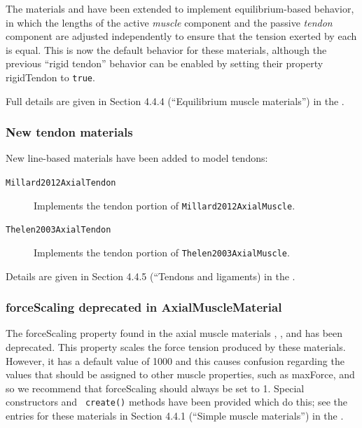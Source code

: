 \documentclass{article}
\begin{document}
The materials 
 and
have been extended to implement
equilibrium-based behavior, in which the lengths of the active {\it
muscle} component and the passive {\it tendon} component are adjusted
independently to ensure that the tension exerted by each is equal.
This is now the default behavior for these materials, although the
previous ``rigid tendon'' behavior can be enabled by setting their
property {\sf rigidTendon} to {\tt true}.

Full details are given in Section 4.4.4 (``Equilibrium muscle materials'') in
the .

\subsubsection{New tendon materials}

New line-based materials have been added to model tendons:

\begin{description}

\item[{\tt Millard2012AxialTendon}]\mbox{}

Implements the tendon portion of {\tt Millard2012AxialMuscle}.

\item[{\tt Thelen2003AxialTendon}]\mbox{}

Implements the tendon portion of {\tt Thelen2003AxialMuscle}.

\end{description}

Details are given in Section 4.4.5 (``Tendons and ligaments) in the
.

\subsubsection{forceScaling deprecated in AxialMuscleMaterial}

The {\sf forceScaling} property found in the axial muscle materials
,
, and
 has been
deprecated. This property scales the force tension produced by these
materials. However, it has a default value of 1000 and this causes
confusion regarding the values that should be assigned to other muscle
properties, such as {\sf maxForce}, and so we recommend that {\sf
forceScaling} should always be set to 1. Special constructors and {\tt
create()} methods have been provided which do this; see the entries
for these materials in Section 4.4.1 (``Simple muscle materials'') in
the .
\end{document}
